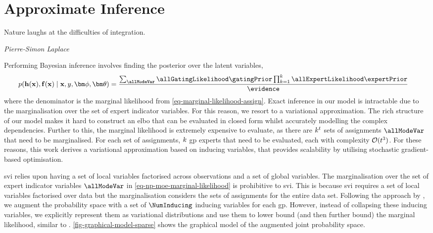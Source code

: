 \documentclass{mimosis-class/mimosis}
\numberwithin{equation}{chapter}
\newcommand{\numData}{\ensuremath{t}}
\newcommand{\modeInd}{\ensuremath{k}}
\newcommand{\NumData}{\ensuremath{\MakeUppercase{\numData}}}
\newcommand{\ModeInd}{\ensuremath{\MakeUppercase{\modeInd}}}
\newcommand{\allData}[1]{\ensuremath{\MakeUppercase{#1}}}
\newcommand{\x}{\ensuremath{\mathbf{x}}}
\newcommand{\y}{\ensuremath{y}}
\newcommand{\allInput}{\ensuremath{\allData{\x}}}
\newcommand{\allOutput}{\ensuremath{\allData{\y}}}
\newcommand{\gatingFunc}{\ensuremath{h}}
\newcommand{\GatingFunc}{\ensuremath{\mathbf{\gatingFunc}}}
\newcommand{\latentFunc}{\ensuremath{f}}
\newcommand{\LatentFunc}{\ensuremath{\mathbf{\latentFunc}}}
\newcommand{\gatingParams}{\ensuremath{\bm\phi}}
\newcommand{\expertParams}{\ensuremath{\bm\theta}}
\begin{document}
{\section{Approximate Inference \label{sec-inference}}
\label{sec:org37c1060}
\epigraph{Nature laughs at the difficulties of integration.}{\textit{Pierre-Simon Laplace}}
Performing Bayesian inference involves finding the posterior over the latent variables,
\begin{align} \label{eq-}
p(\GatingFunc(\allInput), \LatentFunc(\allInput) \mid \allInput, \allOutput, \gatingParams, \expertParams)
&= \frac{\sum_{\allModeVar} \allGatingLikelihood \gatingPrior
\prod_{\modeInd=1}^{\ModeInd} \allExpertLikelihood \expertPrior}{\evidence}
\end{align}
where the denominator is the marginal likelihood from \cref{eq-marginal-likelihood-assign}.
Exact inference in our model is intractable due to the marginalisation over the set of expert indicator variables.
For this reason, we resort to a variational approximation.
The rich structure of our model makes it hard to construct an \acrshort{elbo} that can
be evaluated in closed form whilst accurately modelling the complex dependencies.
Further to this, the marginal likelihood is extremely expensive to evaluate,
as there are \(\ModeInd^{\NumData}\) sets of assignments \(\allModeVar\) that need to be marginalised.
For each set of assignments, \(\ModeInd\) \acrshort{gp} experts that need to be evaluated, each with
complexity \(\mathcal{O}(\NumData^{3})\).
For these reasons, this work derives a variational approximation based on inducing variables, that provides scalability
by utilising stochastic gradient-based optimisation.

\acrfull{svi} \citep{hoffmanStochastic2013} relies upon having a set of local variables
factorised across observations and a set of global variables.
The marginalisation over the set of expert indicator variables \(\allModeVar\)
in \cref{eq-np-moe-marginal-likelihood} is prohibitive to \acrshort{svi}.
This is because \acrshort{svi} requires a set of local variables factorised over data but the
marginalisation considers the sets of assignments for the entire data set.
Following the approach by \cite{titsiasVariational2009}, we augment the probability space
with a set of \(\NumInducing\) inducing variables for each \acrshort{gp}.
However, instead of collapsing these inducing variables, we explicitly
represent them as variational distributions and use them to lower bound
(and then further bound) the marginal likelihood, similar to
\cite{hensmanGaussian2013,hensmanScalable2015}.
\cref{fig-graphical-model-sparse} shows the graphical model of the augmented joint probability space.


}
\end{document}
